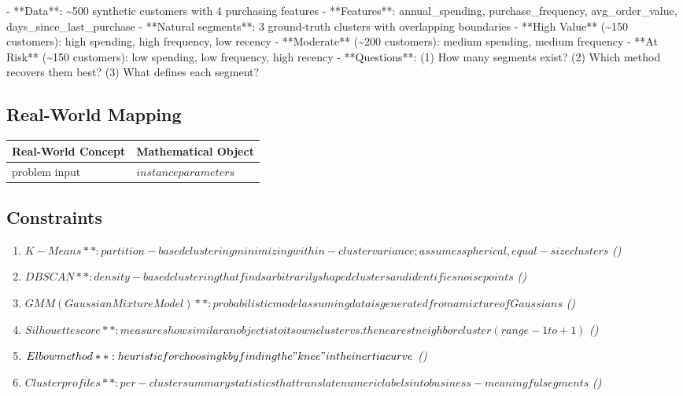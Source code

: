 \documentclass[11pt, a4paper]{article}
\begin{document}
- **Data**: \textasciitilde{}500 synthetic customers with 4 purchasing features
- **Features**: annual\_spending, purchase\_frequency, avg\_order\_value, days\_since\_last\_purchase
- **Natural segments**: 3 ground-truth clusters with overlapping boundaries
  - **High Value** (\textasciitilde{}150 customers): high spending, high frequency, low recency
  - **Moderate** (\textasciitilde{}200 customers): medium spending, medium frequency
  - **At Risk** (\textasciitilde{}150 customers): low spending, low frequency, high recency
- **Questions**: (1) How many segments exist? (2) Which method recovers them best? (3) What defines each segment?

\subsection{Real-World Mapping}

\begin{longtable}{ll}
\toprule
\textbf{Real-World Concept} & \textbf{Mathematical Object} \\
\midrule
\endhead
problem input & $instance parameters$ \\
\bottomrule
\end{longtable}

\subsection{Constraints}

\begin{enumerate}
  \item $K-Means**: partition-based clustering minimizing within-cluster variance; assumes spherical, equal-size clusters$
  \hfill \textit{()}
  \item $DBSCAN**: density-based clustering that finds arbitrarily shaped clusters and identifies noise points$
  \hfill \textit{()}
  \item $GMM (Gaussian Mixture Model)**: probabilistic model assuming data is generated from a mixture of Gaussians$
  \hfill \textit{()}
  \item $Silhouette score**: measures how similar an object is to its own cluster vs. the nearest neighbor cluster (range -1 to +1)$
  \hfill \textit{()}
  \item $Elbow method**: heuristic for choosing k by finding the "knee" in the inertia curve$
  \hfill \textit{()}
  \item $Cluster profiles**: per-cluster summary statistics that translate numeric labels into business-meaningful segments$
  \hfill \textit{()}
\end{enumerate}
\end{document}
